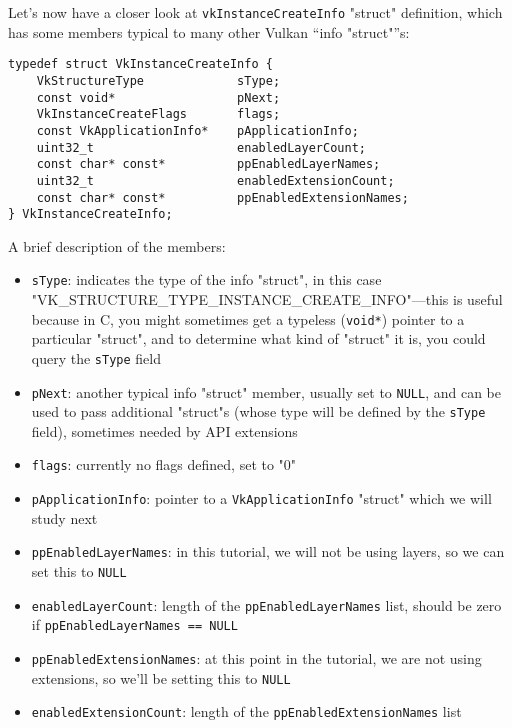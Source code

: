 \documentclass[12pt,letterpaper]{article}
\newcommand{\inquotes}[1]{``#1''}	%
\newcommand{\cil}[1]{\texttt{#1}}
\begin{document}
	Let's now have a closer look at \cil{vkInstanceCreateInfo} "struct" definition, which has some members typical to many other Vulkan \inquotes{info "struct"}s:
		\begin{verbatim}
typedef struct VkInstanceCreateInfo {
	VkStructureType             sType;
	const void*                 pNext;
	VkInstanceCreateFlags       flags;
	const VkApplicationInfo*    pApplicationInfo;
	uint32_t                    enabledLayerCount;
	const char* const*          ppEnabledLayerNames;
	uint32_t                    enabledExtensionCount;
	const char* const*          ppEnabledExtensionNames;
} VkInstanceCreateInfo;
		\end{verbatim}
	A brief description of the members:
		\begin{itemize}
			\item \cil{sType}: indicates the type of the info "struct", in this case "VK\_STRUCTURE\_TYPE\_INSTANCE\_CREATE\_INFO"---this is useful because in C, you might sometimes get a typeless (\cil{void*}) pointer to a particular "struct", and to determine what kind of "struct" it is, you could query the \cil{sType} field
			
			\item \cil{pNext}: another typical info "struct" member, usually set to \cil{NULL}, and can be used to pass additional "struct"s (whose type will be defined by the \cil{sType} field), sometimes needed by API extensions
			
			\item \cil{flags}: currently no flags defined, set to "0"
			
			\item \cil{pApplicationInfo}: pointer to a \cil{VkApplicationInfo} "struct" which we will study next
			
			\item \cil{ppEnabledLayerNames}: in this tutorial, we will not be using layers, so we can set this to \cil{NULL}
			
			\item \cil{enabledLayerCount}: length of the \cil{ppEnabledLayerNames} list, should be zero if \cil{ppEnabledLayerNames == NULL}
			
			\item \cil{ppEnabledExtensionNames}: at this point in the tutorial, we are not using extensions, so we'll be setting this to \cil{NULL}
			
			\item \cil{enabledExtensionCount}: length of the \cil{ppEnabledExtensionNames} list
		\end{itemize}
\end{document}
